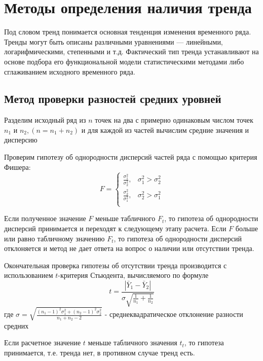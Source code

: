 \documentclass[a4paper,12pt]{article}
\begin{document}
\newpage
\section{Методы определения наличия тренда}
Под словом тренд понимается основная тенденция изменения временного ряда.\\Тренды могут быть описаны различными уравнениями — линейными, логарифмическими, степенными и т.д. Фактический тип тренда устанавливают на основе подбора его функциональной модели статистическими методами либо сглаживанием исходного временного ряда.

\vfill
\subsection{Метод проверки разностей средних уровней}
Разделим исходный ряд из $n$ точек на два с примерно одинаковым числом точек $n_1$ и $n_2, (n = n_1 + n_2)$ и для каждой из частей вычислим средние значения и дисперсию

\vspace{0.5cm}
Проверим гипотезу об однородности дисперсий частей ряда с помощью критерия Фишера:
$$F = \left\{\begin{array}{ll}
	\frac{\sigma_1^2}{\sigma_2^2}, & \sigma_1^2 > \sigma_2^2\\
	\frac{\sigma_2^2}{\sigma_1^2}, & \sigma_2^2 > \sigma_1^2\\	
\end{array}\right.$$
 
\vspace{0.5cm}
Если полученное значение $F$ меньше табличного $F_t$, то гипотеза об однородности дисперсий принимается и переходят к следующему этапу расчета. Если $F$ больше или равно табличному значению $F_t$, то гипотеза об однородности дисперсий отклоняется и метод не дает ответа на вопрос о наличии или отсутствии тренда.

Окончательная проверка гипотезы об отсутствии тренда производится с использованием $t$-критерия Стьюдента, вычисляемого по формуле
$$t = \frac{|\bar{Y}_1 - \bar{Y}_2|}{\sigma \sqrt{\frac{1}{n_1} + \frac{1}{n_2}}}$$
где $\sigma = \sqrt{\frac{(n_1 - 1)^2\sigma_1^2 + (n_2 - 1)^2\sigma_2^2}{n_1 + n_2 - 2}}$ - среднеквадратическое отклонение разности средних

\vspace{0.5cm}
Если расчетное значение $t$ меньше табличного значения $t_t$, то гипотеза принимается, т.е. тренда нет, в противном случае тренд есть. 
\end{document}
